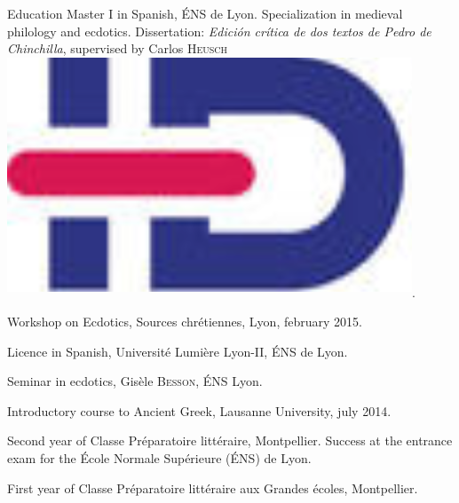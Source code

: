 \begin{rubric}{Education}
                                \entry*[2014-2015]
                            Master I in Spanish, ÉNS de Lyon. Specialization in medieval philology
                        and ecdotics. Dissertation: \textit{Edición crítica de dos textos de Pedro de
                        Chinchilla}, supervised by Carlos
                        \textsc{Heusch}\href{https://www.idref.fr/055838413}{\textsuperscript{\includegraphics[scale=0.025]{img/idref.png}}}.
                    
                                \entry*
                            Workshop on Ecdotics, Sources chrétiennes, Lyon, february
                        2015.
                    
                                \entry*[2013-2014]
                            Licence in Spanish, Université Lumière Lyon-II, ÉNS de Lyon.
                    
                                \entry*
                            Seminar in ecdotics, Gisèle \textsc{Besson}, ÉNS
                        Lyon.
                    
                                \entry*
                            Introductory course to Ancient Greek, Lausanne University, july
                        2014.
                    
                                \entry*[2012-2013]
                            Second year of Classe Préparatoire littéraire, Montpellier. Success at
                        the entrance exam for the École Normale Supérieure (ÉNS) de Lyon.
                    
                                \entry*[2011-2012]
                            First year of Classe Préparatoire littéraire aux Grandes écoles,
                        Montpellier.
                    \end{rubric}






